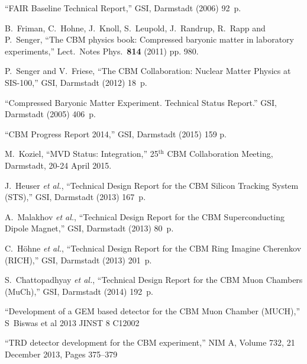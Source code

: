 \begin{thebibliography}{99}

``FAIR Baseline Technical Report,'' GSI, Darmstadt  (2006) 92~p. \\


B.~Friman, C.~Hohne, J.~Knoll, S.~Leupold, J.~Randrup, R.~Rapp and P.~Senger, ``The CBM physics book: Compressed baryonic matter in laboratory experiments,''
  Lect.\ Notes Phys.\  {\bf 814} (2011) pp. 980.

  P.~Senger and V.~Friese, ``The CBM Collaboration: Nuclear Matter Physics at SIS-100,'' GSI, Darmstadt (2012) 18~p.

``Compressed Baryonic Matter Experiment. Technical Status Report.'' GSI, Darmstadt (2005) 406~p.

``CBM Progress Report 2014,'' GSI, Darmstadt (2015) 159 p.


M.~Koziel, ``MVD Status: Integration,'' 25$^\mathrm{th}$ CBM Collaboration Meeting, Darmstadt, 20-24 April 2015.\\ 

J.~Heuser {\it et al.}, ``Technical Design Report for the CBM Silicon Tracking System (STS),'' GSI, Darmstadt (2013) 167~p.

A.~Malakhov {\it et al.}, ``Technical Design Report for the CBM Superconducting Dipole Magnet,'' GSI, Darmstadt (2013) 80~p.

C.~H\"{o}hne {\it et al.}, ``Technical Design Report for the CBM Ring Imagine Cherenkov (RICH),'' GSI, Darmstadt (2013) 201~p.

S.~Chattopadhyay {\it et al.}, ``Technical Design Report for the CBM Muon Chambers (MuCh),'' GSI, Darmstadt (2014) 192~p.

``Development of a GEM based detector for the CBM Muon Chamber (MUCH),''
S~Biswas et al 2013 JINST 8 C12002

``TRD detector development for the CBM experiment,''
NIM A, Volume 732, 21 December 2013, Pages 375–379


\end{thebibliography}
